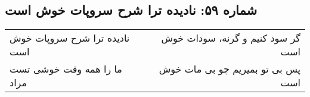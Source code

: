 \begin{center}
\section*{شماره ۵۹: نادیده ترا شرح سروپات خوش است}
\label{sec:059}
\begin{longtable}{l p{0.5cm} r}
نادیده ترا شرح سروپات خوش است
&&
گر سود کنیم و گرنه، سودات خوش است
\\
ما را همه وقت خوشی تست مراد
&&
پس بی تو بمیریم چو بی مات خوش است
\\
\end{longtable}
\end{center}
